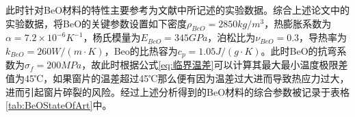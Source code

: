 \documentclass[master]{thesis-uestc}
\begin{document}
此时针对BeO材料的特性主要参考为文献\cite{thumm_stateart_2020, slack_thermal_1971,kozlovskii_thermal_2014}中所记述的实验数据。综合上述论文中的实验数据，将BeO的关键参数设置如下密度\(\rho_{BeO} = 2850kg/m^3\)，热膨胀系数为\(\alpha = 7.2 \times 10^{-6} K^{-1}\)，杨氏模量为\(E_{BeO} = 345GPa\)，泊松比为\(\nu_{BeO} = 0.3\)，导热率为\(k_{BeO} = 260 W/(m \cdot K)\)，Beo的比热容为\(c_p=1.05J/(g \cdot K)\)。此时BeO的抗弯系数为$\sigma_f = 200MPa$，故此时根据公式\ref{eq:临界温差}可以计算其最大最小温度极限差值为45℃，如果窗片的温差超过45℃那么便有因为温差过大进而导致热应力过大，进而引起窗片碎裂的风险。经过上述分析得到的BeO材料的综合参数被记录于表格\ref{tab:BeOStateOfArt}中。
\begin{table}[!htb]
    \caption{BeO材料属性}
    \label{tab:BeOStateOfArt}
\end{table}
\end{document}
